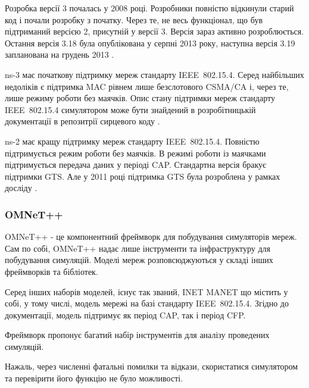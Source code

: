 \documentclass[a4paper,ukrainian,utf8,nocolumnsxix,floatsection,equationsection]{eskdtext}
\renewcommand\paragraph{\subsubsection}
\newcommand{\todoi}[1]{\todo[inline]{#1}}
\newcommand{\iee}[0]{IEEE~802.15.4\xspace}
\newcommand{\csma}[0]{CSMA/CA\xspace}
\begin{document}
Розробка версії 3 почалась у 2008 році. Розробники повністю відкинули старий код і почали розробку з початку. Через те, не весь функціонал, що був підтриманий версією 2, присутній у версії 3. Версія зараз активно розроблюється. Остання версія 3.18 була опублікована у серпні 2013 року, наступна версія 3.19 запланована на грудень 2013 \cite{nsnam:current:development}.  


ns-3 має початкову підтримку мереж стандарту \iee. Серед найбільших недоліків є підтримка MAC рівнем лише безслотового \csma і, через те, лише режиму роботи без маячків. Опис стану підтримки мереж стандарту \iee симулятором може бути знайдений в розробітницькій  документації в репозитрії сирцевого коду \cite{ns3:lrwpan}.

ns-2 має кращу підтримку мереж стандарту \iee. Повністю підтримується режим роботи без маячків. В режимі роботи із маячками підтримується передача даних у періоді CAP. Стандартна версія бракує підтримки GTS. Але у 2011 році підтримка GTS була розроблена у рамках досліду \cite{ns2:with:cfp}.

\paragraph{OMNeT++}

OMNeT++ - це компонентний фреймворк для побудування симуляторів мереж. Сам по собі, OMNeT++ надає лише інструменти та інфраструктуру для побудування симуляцій. Моделі мереж розповсюджуються у складі інших фреймворків та бібліотек. 

Серед інших наборів моделей, існує так званий, INET MANET що містить у собі, у тому числі, модель мережі на базі стандарту \iee.  Згідно до документації, модель підтримує як період CAP, так і період CFP. 

Фреймворк пропонує багатий набір інструментів для аналізу проведених симуляцій. 

Нажаль, через численні фатальні помилки та відкази, скористатися симулятором та перевірити його функцію не було можливості.




\end{document}
